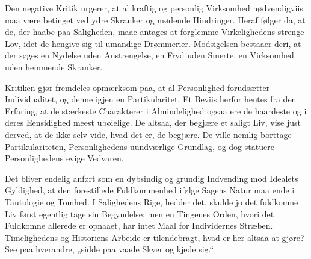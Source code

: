 \documentclass[12pt]{book}
\newcommand{\opage}[1]{\marginnote{\footnotesize\textit{[#1]}}}
\begin{document}
Den negative Kritik urgerer, at al kraftig og personlig Virksomhed nødvendigviis maa
være betinget ved ydre Skranker og mødende Hindringer. Heraf følger da, at de, der
haabe paa Saligheden, maae antages at forglemme Virkelighedens strenge Lov, idet de
hengive sig til umandige Drømmerier. Modsigelsen bestaaer deri, at der søges en
Nydelse uden Anstrengelse, en Fryd uden Smerte, en Virksomhed uden hemmende
Skranker.

Kritiken gjør fremdeles opmærksom paa, at al Personlighed forudsætter
Individualitet, og denne igjen en Partikularitet. Et Beviis herfor hentes fra den
Erfaring, at de stærkeste Charakterer i Almindelighed ogsaa ere de haardeste og i
deres Eensidighed meest ubøielige. De altsaa, der begjære et saligt Liv, vise just
derved, at de ikke selv vide, hvad det er, de begjære. De ville nemlig borttage
Partikulariteten, Personlighedens uundværlige Grundlag, og dog statuere
Personlighedens evige Vedvaren.

Det bliver endelig anført som en dybsindig og grundig Indvending mod Idealets
Gyldighed, at den forestillede Fuldkommenhed ifølge Sagens Natur maa ende i
Tautologie og Tomhed. I Salighedens Rige, hedder det, skulde jo det fuldkomne Liv
først egentlig tage sin Begyndelse; men en Tingenes Orden, hvori det Fuldkomne
allerede er opnaaet, har intet Maal for Individernes Stræben. Timelighedens og
Historiens Arbeide er tilendebragt, hvad er her altsaa at
\opage{274} gjøre? See paa hverandre, „sidde paa vaade Skyer og kjede sig.“
\end{document}
